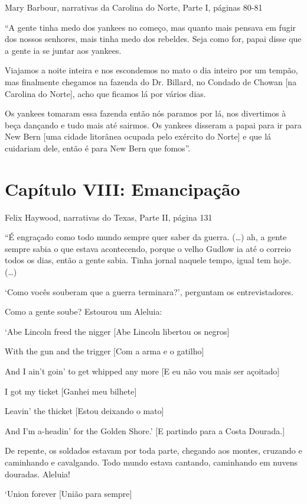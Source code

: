 Mary Barbour, narrativas da Carolina do Norte, Parte I, páginas 80-81

``A gente tinha medo dos yankees no começo, mas quanto mais pensava em
fugir dos nossos senhores, mais tinha medo dos rebeldes. Seja como for,
papai disse que a gente ia se juntar aos yankees.

Viajamos a noite inteira e nos escondemos no mato o dia inteiro por um
tempão, mas finalmente chegamos na fazenda do Dr. Billard, no Condado de
Chowan {[}na Carolina do Norte{]}, acho que ficamos lá por vários dias.

Os yankees tomaram essa fazenda então nós paramos por lá, nos divertimos
à beça dançando e tudo mais até sairmos. Os yankees disseram a papai
para ir para New Bern {[}uma cidade litorânea ocupada pelo exército do
Norte{]} e que lá cuidariam dele, então é para New Bern que fomos''.

\chapter{Capítulo VIII: Emancipação}

Felix Haywood, narrativas do Texas, Parte II, página 131

``É engraçado como todo mundo sempre quer saber da guerra. (\ldots{})
ah, a gente sempre sabia o que estava acontecendo, porque o velho Gudlow
ia até o correio todos os dias, então a gente sabia. Tinha jornal
naquele tempo, igual tem hoje. (\ldots{})

`Como vocês souberam que a guerra terminara?', perguntam os
entrevistadores.

Como a gente soube? Estourou um Aleluia:

`Abe Lincoln freed the nigger {[}Abe Lincoln libertou os negros{]}

With the gun and the trigger {[}Com a arma e o gatilho{]}

And I ain't goin' to get whipped any more {[}E eu não vou mais ser
açoitado{]}

I got my ticket {[}Ganhei meu bilhete{]}

Leavin' the thicket {[}Estou deixando o mato{]}

And I'm a-headin' for the Golden Shore.' {[}E partindo para a Costa
Dourada.{]}

De repente, os soldados estavam por toda parte, chegando aos montes,
cruzando e caminhando e cavalgando. Todo mundo estava cantando,
caminhando em nuvens douradas. Aleluia!

`Union forever {[}União para sempre{]}

